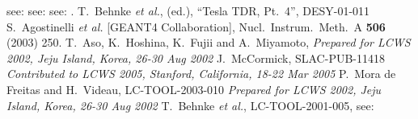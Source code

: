 \begin{thebibliography}{99}
see: 
see: 
see: 
.
  T.~Behnke {\it et al.}, (ed.), ``Tesla TDR, Pt.~4'',
DESY-01-011
S.~Agostinelli {\it et al.}  [GEANT4 Collaboration],
Nucl.\ Instrum.\ Meth.\ A {\bf 506} (2003) 250.
T.~Aso, K.~Hoshina, K.~Fujii and A.~Miyamoto,
{\it Prepared for LCWS 2002, Jeju Island, Korea, 26-30 Aug 2002}
J.~McCormick,
SLAC-PUB-11418
{\it Contributed to LCWS 2005, Stanford, California, 18-22 Mar 2005}
  P.~Mora de Freitas and H.~Videau, LC-TOOL-2003-010
{\it Prepared for LCWS 2002, Jeju Island, Korea, 26-30 Aug 2002}
  T.~Behnke {\it et al.}, LC-TOOL-2001-005,
see: 

\end{thebibliography}
